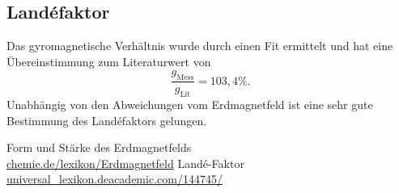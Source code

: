 \subsection{Landéfaktor}
Das gyromagnetische Verhältnis wurde durch einen Fit ermittelt und hat eine Übereinstimmung zum Literaturwert \cite{Gyro} von
\begin{equation}
 \frac{g_\text{Mess}}{g_\text{Lit}} = 103,4 \%.
\end{equation}
Unabhängig von den Abweichungen vom Erdmagnetfeld ist eine sehr gute Bestimmung des Landéfaktors gelungen. 



\begin{thebibliography}{xxxxxxxxxxxxxxxxx}
 Form und Stärke des Erdmagnetfelds\\ \href{http://www.chemie.de/lexikon/Erdmagnetfeld.html#Form_und_St.C3.A4rke_des_Erdmagnetfeldes}{chemie.de/lexikon/Erdmagnetfeld}
 Landé-Faktor\\ \href{http://universal\_lexikon.deacademic.com/144745/}{universal\_lexikon.deacademic.com/144745/}
\end{thebibliography}





